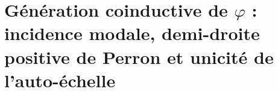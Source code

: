 \chapter{Génération coinductive de \(\varphi\) : incidence modale, demi-droite positive de Perron et unicité de l’auto-échelle}
\label{chap:p3-final:30:generacion_phi}

